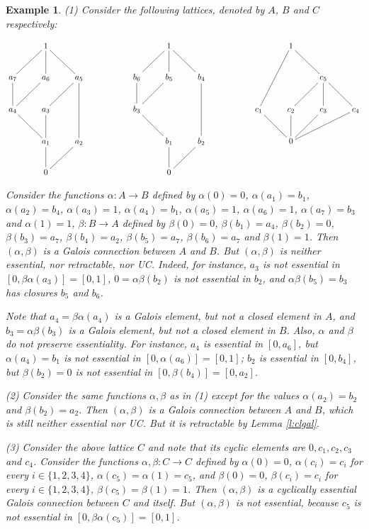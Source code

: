 \documentclass[11pt,a4paper]{amsart}
\newtheorem{ex}[theorem]{Example}
\begin{document}
\begin{ex} \rm (1) Consider the following lattices, denoted by $A$, $B$ and $C$ respectively:
\begin{scriptsize} 
\[\SelectTips{cm}{}
\xymatrix{
 & 1 \ar@{-}[dl] \ar@{-}[d] \ar@{-}[dr] & &&& 1 \ar@{-}[dl] \ar@{-}[d] \ar@{-}[dr] & &&& 1 \ar@{-}[ddl] \ar@{-}[dr] &&
\\ 
a_7 \ar@{-}[d] & a_6 \ar@{-}[dl] & a_5 \ar@{-}[dl] \ar@{-}[dd] && b_6 \ar@{-}[d] & b_5 \ar@{-}[dl] & b_4 \ar@{-}[dd]
&&&& c_5 \ar@{-}[dl] \ar@{-}[d] \ar@{-}[dr] & \\
a_4 \ar@{-}[dr] & a_3 \ar@{-}[d] & & & b_3 \ar@{-}[dr] & & && c_1 \ar@{-}[dr] & c_2 \ar@{-}[d] & c_3 \ar@{-}[dl] & c_4
\ar@{-}[dll] \\
 & a_1 \ar@{-}[d] & a_2 \ar@{-}[dl] & & & b_1 \ar@{-}[d] & b_2 \ar@{-}[dl] && & 0 && \\
 & 0 & & & & 0 & &&&&& \\
}\]
\end{scriptsize} 

Consider the functions $\alpha:A\to B$ defined by $\alpha(0)=0$, $\alpha(a_1)=b_1$, $\alpha(a_2)=b_4$,
$\alpha(a_3)=1$, $\alpha(a_4)=b_1$, $\alpha(a_5)=1$, $\alpha(a_6)=1$, $\alpha(a_7)=b_3$ and $\alpha(1)=1$,
$\beta:B\to A$ defined by $\beta(0)=0$, $\beta(b_1)=a_4$, $\beta(b_2)=0$, $\beta(b_3)=a_7$, $\beta(b_4)=a_2$,
$\beta(b_5)=a_7$, $\beta(b_6)=a_7$ and $\beta(1)=1$. Then $(\alpha,\beta)$ is a Galois connection between $A$ and $B$.
But $(\alpha,\beta)$ is neither essential, nor retractable, nor UC. Indeed, for instance, $a_3$ is not essential in
$[0,\beta\alpha(a_3)]=[0,1]$, $0=\alpha\beta(b_2)$ is not essential in $b_2$, and $\alpha\beta(b_5)=b_3$ has closures
$b_5$ and $b_6$. 

Note that $a_4=\beta\alpha(a_4)$ is a Galois element, but not a closed element in $A$, and $b_3=\alpha\beta(b_3)$ is a
Galois element, but not a closed element in $B$. Also, $\alpha$ and $\beta$ do not preserve essentiality. For
instance, $a_4$ is essential in $[0,a_6]$, but $\alpha(a_4)=b_1$ is not essential in $[0,\alpha(a_6)]=[0,1]$; $b_2$ is
essential in $[0,b_4]$, but $\beta(b_2)=0$ is not essential in $[0,\beta(b_4)]=[0,a_2]$. 

(2) Consider the same functions $\alpha,\beta$ as in (1) except for the values $\alpha(a_2)=b_2$ and
$\beta(b_2)=a_2$. Then $(\alpha,\beta)$ is a Galois connection between $A$ and $B$, which is still neither essential
nor UC. But it is retractable by Lemma \ref{l:clgal}.

(3) Consider the above lattice $C$ and note that its cyclic elements are $0,c_1,c_2,c_3$ and $c_4$. Consider the
functions $\alpha,\beta:C\to C$ defined by $\alpha(0)=0$, $\alpha(c_i)=c_i$ for every $i\in \{1,2,3,4\}$,
$\alpha(c_5)=\alpha(1)=c_5$, and $\beta(0)=0$, $\beta(c_i)=c_i$ for every $i\in \{1,2,3,4\}$, $\beta(c_5)=\beta(1)=1$.
Then $(\alpha,\beta)$ is a cyclically essential Galois connection between $C$ and itself. But $(\alpha,\beta)$ is not
essential, because $c_5$ is not essential in $[0,\beta\alpha(c_5)]=[0,1]$. 
\end{ex}
\end{document}
